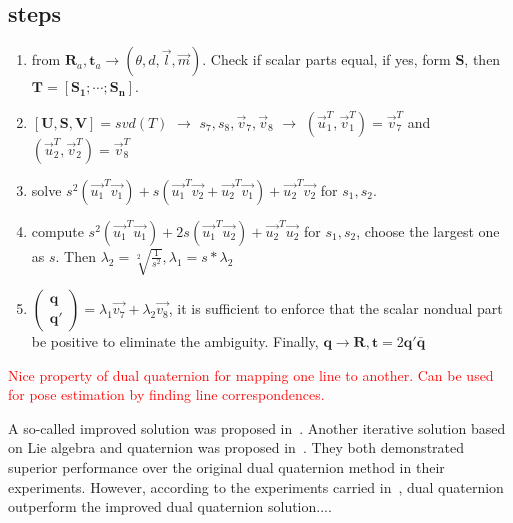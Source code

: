 \documentclass[a4paper]{report}
\begin{document}
\subsection{steps}
\begin{enumerate}
\item from $\mathbf{R}_a, \mathbf{t}_a \to (\theta, d, \vec{l}, \vec{m})$. Check if scalar parts equal, if yes, form $\mathbf{S}$, then $\mathbf{T}=[\mathbf{S_1};\cdots;\mathbf{S_n}]$.
\item $[\mathbf{U,S,V}]=svd(T)$ $\to$ $s_7, s_8, \vec{v}_7, \vec{v}_8$ $\to$ $(\vec{u}_1^T, \vec{v}_1^T) = \vec{v}_7^T$ and $(\vec{u}_2^T, \vec{v}_2^T) = \vec{v}_8^T$
\item solve $s^2(\vec{u_1}^T\vec{v_1})+s(\vec{u_1}^T\vec{v_2}+\vec{u_2}^T\vec{v_1})+\vec{u_2}^T\vec{v_2}$ for $s_1,s_2$.
\item compute $s^2(\vec{u_1}^T\vec{u_1})+2s(\vec{u_1}^T\vec{u_2})+\vec{u_2}^T\vec{u_2}$ for $s_1,s_2$, choose the largest one as $s$. Then $\lambda_2=\sqrt[2]{\frac{1}{s^2}}, \lambda_1=s*\lambda_2$
\item $\left( \begin{matrix}
\mathbf{q} \\
\mathbf{q}'
\end{matrix} \right)=\lambda_1 \vec{v_7} + \lambda_2 \vec{v_8}$, it is sufficient to enforce that the scalar nondual part be positive to eliminate the ambiguity. Finally, $\mathbf{q} \to \mathbf{R}, \mathbf{t}=2\mathbf{q'}\bar{\mathbf{q}}$
\end{enumerate}

\textcolor{red}{Nice property of dual quaternion for mapping one line to another. Can be used for pose estimation by finding line correspondences.}

A so-called improved solution was proposed in~\cite{malti2010robust}. Another iterative solution based on Lie algebra and quaternion was proposed in~\cite{pachtrachai2018adjoint}. They both demonstrated superior performance over the original dual quaternion method in their experiments. However, according to the experiments carried in~\cite{pachtrachai2018adjoint}, dual quaternion outperform the improved dual quaternion solution....
\end{document}
